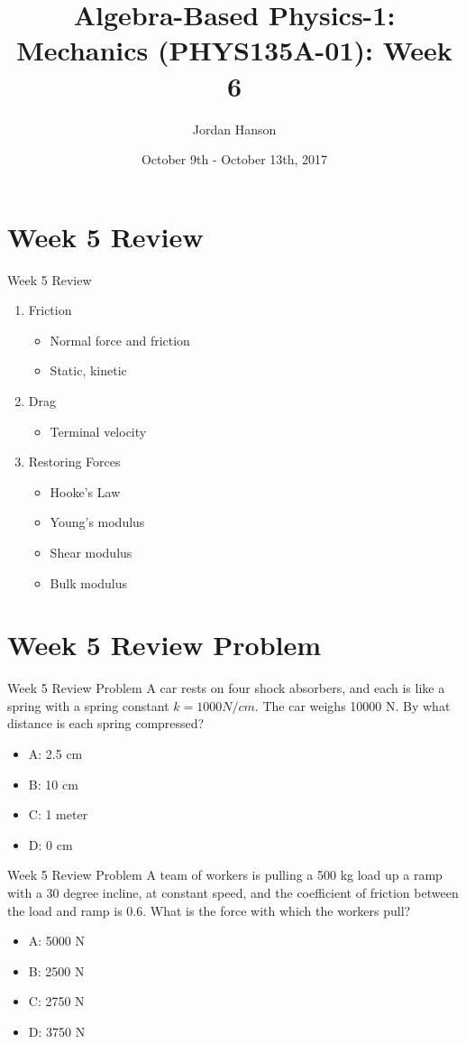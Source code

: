 \documentclass{beamer}
\title{Algebra-Based Physics-1: Mechanics (PHYS135A-01): Week 6}
\date{October 9th - October 13th, 2017}
\author{Jordan Hanson}
\institute{Whittier College Department of Physics and Astronomy}
\begin{document}
\maketitle

\section{Week 5 Review}

\begin{frame}{Week 5 Review}
\begin{enumerate}
\item \alert{Friction}
\begin{itemize}
\item Normal force and friction
\item Static, kinetic
\end{itemize}
\item \alert{Drag}
\begin{itemize}
\item Terminal velocity
\end{itemize}
\item \alert{Restoring Forces}
\begin{itemize}
\item Hooke's Law
\item Young's modulus
\item Shear modulus
\item Bulk modulus
\end{itemize}
\end{enumerate}
\end{frame}

\section{Week 5 Review Problem}

\begin{frame}{Week 5 Review Problem}
A car rests on four shock absorbers, and each is like a spring with a spring constant $k = 1000 N/cm$.  The car weighs 10000 N.  By what distance is each spring compressed?
\begin{itemize}
\item A: 2.5 cm
\item B: 10 cm
\item C: 1 meter
\item D: 0 cm
\end{itemize}
\end{frame}

\begin{frame}{Week 5 Review Problem}
A team of workers is pulling a 500 kg load up a ramp with a 30 degree incline, at constant speed, and the coefficient of friction between the load and ramp is 0.6.  What is the force with which the workers pull?
\begin{itemize}
\item A: 5000 N
\item B: 2500 N
\item C: 2750 N
\item D: 3750 N
\end{itemize}
\end{frame}
\end{document}
